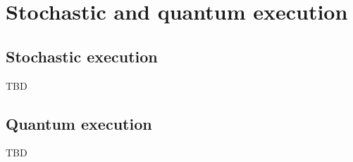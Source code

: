 \section{Stochastic and quantum execution}

\subsection{Stochastic execution}

TBD

\subsection{Quantum execution}

TBD
